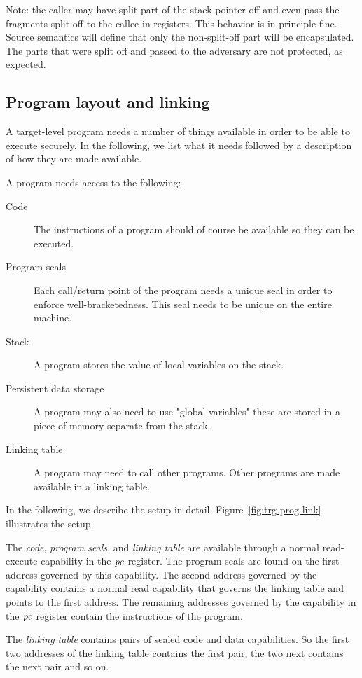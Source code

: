 \documentclass[a4paper]{article}
\begin{document}
Note: the caller may have split part of the stack pointer off and even pass the fragments split off to the callee in registers.
This behavior is in principle fine.
Source semantics will define that only the non-split-off part will be encapsulated.
The parts that were split off and passed to the adversary are not protected, as expected.

\subsection{Program layout and linking}
A target-level program needs a number of things available in order to be able to execute securely. In the following, we list what it needs followed by a description of how they are made available.

A program needs access to the following:
\begin{description}
\item[Code] The instructions of a program should of course be available so they can be executed.
\item[Program seals] Each call/return point of the program needs a unique seal in order to enforce well-bracketedness. This seal needs to be unique on the entire machine.
\item[Stack] A program stores the value of local variables on the stack. 
\item[Persistent data storage] A program may also need to use "global variables" these are stored in a piece of memory separate from the stack.
\item[Linking table] A program may need to call other programs. Other programs are made available in a linking table.
\end{description}

In the following, we describe the setup in detail. Figure~\ref{fig:trg-prog-link} illustrates the setup.

The \emph{code}, \emph{program seals}, and \emph{linking table} are available through a normal read-execute capability in the $\mathit{pc}$ register. The program seals are found on the first address governed by this capability. The second address governed by the capability contains a normal read capability that governs the linking table and points to the first address. The remaining addresses governed by the capability in the $\mathit{pc}$ register contain the instructions of the program.

The \emph{linking table} contains pairs of sealed code and data capabilities. So the first two addresses of the linking table contains the first pair, the two next contains the next pair and so on.
\end{document}

